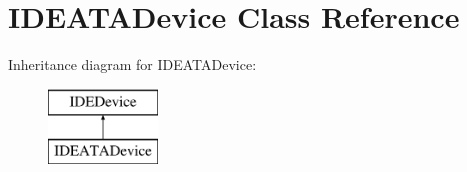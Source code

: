 \hypertarget{classIDEATADevice}{\section{I\-D\-E\-A\-T\-A\-Device Class Reference}
\label{classIDEATADevice}
}
Inheritance diagram for I\-D\-E\-A\-T\-A\-Device\-:\begin{figure}[H]
\begin{center}
\leavevmode
\includegraphics[height=2.000000cm]{classIDEATADevice}
\end{center}
\end{figure}
